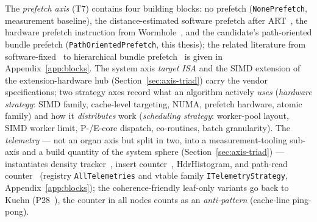 \begin{nurkurz}
The \emph{prefetch axis} (T7) contains four building blocks: no prefetch (\texttt{None\allowbreak{}Prefetch},
measurement baseline), the distance-estimated software prefetch after ART~\cite{leis2013art}, the hardware
prefetch instruction from Wormhole~\cite{wu2019wormhole}, and the candidate's path-oriented bundle prefetch
(\texttt{Path\allowbreak{}Oriented\allowbreak{}Prefetch}, this thesis); the related literature from
software-fixed~\cite{chen2001prefetch} to hierarchical bundle prefetch~\cite{zhang2025hierarchical} is given
in Appendix~\ref{app:blocks}. The system axis \emph{target ISA} and the SIMD extension of the
extension-hardware hub (Section~\ref{sec:axis-triad}) carry the vendor specifications; two strategy axes
record what an algorithm actively \emph{uses} (\emph{hardware strategy}: SIMD family, cache-level targeting,
NUMA, prefetch hardware, atomic family) and how it \emph{distributes} work (\emph{scheduling strategy}:
worker-pool layout, SIMD worker limit, P-/E-core dispatch, co-routines, batch granularity). The
\emph{telemetry} --- not an organ axis but split in two, into a measurement-tooling sub-axis and a build
quantity of the system sphere (Section~\ref{sec:axis-triad}) --- instantiates density
tracker~\cite{leis2013art}, insert counter~\cite{binna2018hot}, HdrHistogram, and path-read
counter~\cite{zhang2024pathprefix} (registry \texttt{All\allowbreak{}Telemetries} and vtable family
\texttt{ITelemetry\allowbreak{}Strategy}, Appendix~\ref{app:blocks}); the coherence-friendly leaf-only
variants go back to Kuehn (P28~\cite{kuehn2023bplustree}), the counter in all nodes counts as an
\emph{anti-pattern} (cache-line ping-pong).
\end{nurkurz}

